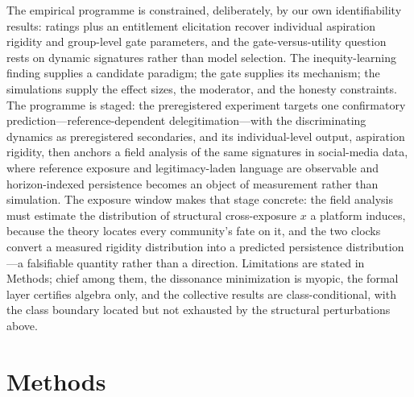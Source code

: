 \documentclass[11pt]{article}
\newcommand{\1}{\mathbf{1}}
\begin{document}
The empirical programme is constrained, deliberately, by our own identifiability results: ratings plus an entitlement elicitation recover individual aspiration rigidity and group-level gate parameters, and the gate-versus-utility question rests on dynamic signatures rather than model selection. The inequity-learning finding\cite{HamJenkins2025} supplies a candidate paradigm; the gate supplies its mechanism; the simulations supply the effect sizes, the moderator, and the honesty constraints. The programme is staged: the preregistered experiment targets one confirmatory prediction---reference-dependent delegitimation---with the discriminating dynamics as preregistered secondaries, and its individual-level output, aspiration rigidity, then anchors a field analysis of the same signatures in social-media data, where reference exposure and legitimacy-laden language are observable and horizon-indexed persistence becomes an object of measurement rather than simulation. The exposure window makes that stage concrete: the field analysis must estimate the distribution of structural cross-exposure $x$ a platform induces, because the theory locates every community's fate on it, and the two clocks convert a measured rigidity distribution into a predicted persistence distribution---a falsifiable quantity rather than a direction. Limitations are stated in Methods; chief among them, the dissonance minimization is myopic, the formal layer certifies algebra only, and the collective results are class-conditional, with the class boundary located but not exhausted by the structural perturbations above.

\section{Methods}
\end{document}
